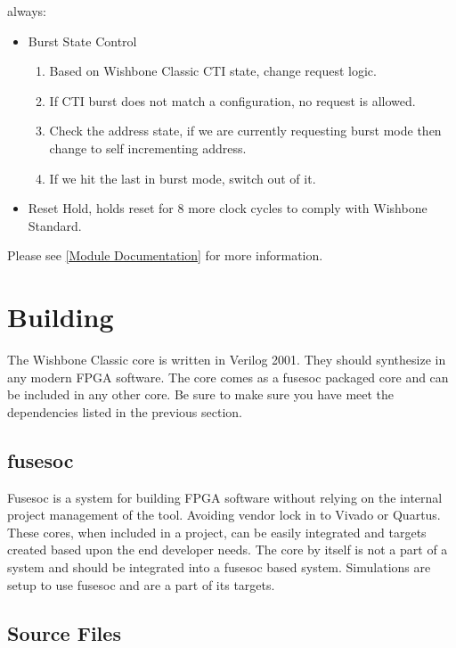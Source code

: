always:
\begin{itemize}
\item Burst State Control
  \begin{enumerate}
    \item Based on Wishbone Classic CTI state, change request logic.
    \item If CTI burst does not match a configuration, no request is allowed.
    \item Check the address state, if we are currently requesting burst mode then change to self incrementing address.
    \item If we hit the last in burst mode, switch out of it.
  \end{enumerate}
\item Reset Hold, holds reset for 8 more clock cycles to comply with Wishbone Standard.
\end{itemize}

Please see \ref{Module Documentation} for more information.

\section{Building}

\par
The Wishbone Classic core is written in Verilog 2001. They should synthesize in any modern FPGA software. The core comes as a fusesoc packaged core and can be
included in any other core. Be sure to make sure you have meet the dependencies listed in the previous section.

\subsection{fusesoc}
\par
Fusesoc is a system for building FPGA software without relying on the internal project management of the tool. Avoiding vendor lock in to Vivado or Quartus.
These cores, when included in a project, can be easily integrated and targets created based upon the end developer needs. The core by itself is not a part of
a system and should be integrated into a fusesoc based system. Simulations are setup to use fusesoc and are a part of its targets.

\subsection{Source Files}



